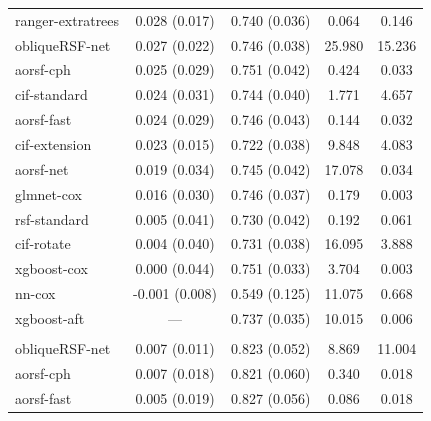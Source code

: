 \documentclass{article}\usepackage[]{graphicx}\usepackage[]{xcolor}
\newenvironment{knitrout}{}{} %
\begin{document}
\begin{knitrout}
\begin{longtable}[t]{lcccc}
\hspace{1em}ranger-extratrees & 0.028 (0.017) & 0.740 (0.036) & 0.064 & 0.146\\
\hspace{1em}obliqueRSF-net & 0.027 (0.022) & 0.746 (0.038) & 25.980 & 15.236\\
\hspace{1em}aorsf-cph & 0.025 (0.029) & 0.751 (0.042) & 0.424 & 0.033\\
\hspace{1em}cif-standard & 0.024 (0.031) & 0.744 (0.040) & 1.771 & 4.657\\
\hspace{1em}aorsf-fast & 0.024 (0.029) & 0.746 (0.043) & 0.144 & 0.032\\
\hspace{1em}cif-extension & 0.023 (0.015) & 0.722 (0.038) & 9.848 & 4.083\\
\hspace{1em}aorsf-net & 0.019 (0.034) & 0.745 (0.042) & 17.078 & 0.034\\
\hspace{1em}glmnet-cox & 0.016 (0.030) & 0.746 (0.037) & 0.179 & 0.003\\
\hspace{1em}rsf-standard & 0.005 (0.041) & 0.730 (0.042) & 0.192 & 0.061\\
\hspace{1em}cif-rotate & 0.004 (0.040) & 0.731 (0.038) & 16.095 & 3.888\\
\hspace{1em}xgboost-cox & 0.000 (0.044) & 0.751 (0.033) & 3.704 & 0.003\\
\hspace{1em}nn-cox & -0.001 (0.008) & 0.549 (0.125) & 11.075 & 0.668\\
\hspace{1em}xgboost-aft & --- & 0.737 (0.035) & 10.015 & 0.006\\
\addlinespace[0.3em]
\multicolumn{5}{l}{\textit{\textbf{ACTG 320; death, n = 1151, p = 12}}}\\
\hline
\hspace{1em}obliqueRSF-net & 0.007 (0.011) & 0.823 (0.052) & 8.869 & 11.004\\
\hspace{1em}aorsf-cph & 0.007 (0.018) & 0.821 (0.060) & 0.340 & 0.018\\
\hspace{1em}aorsf-fast & 0.005 (0.019) & 0.827 (0.056) & 0.086 & 0.018\\

\end{longtable}
\end{knitrout}
\end{document}

